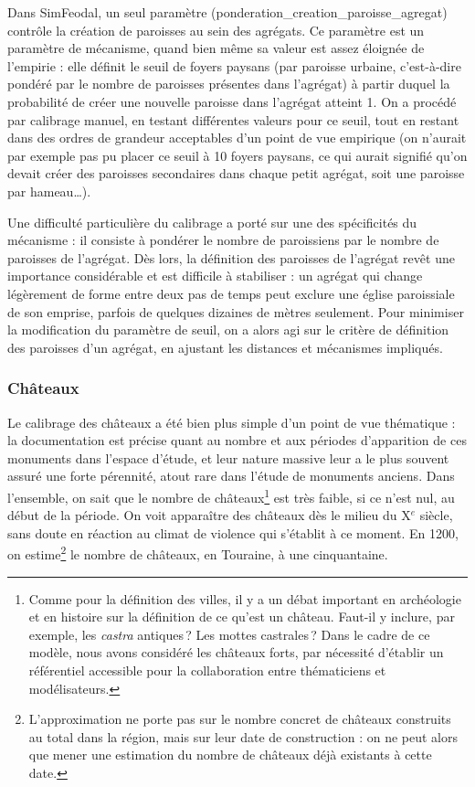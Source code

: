 Dans SimFeodal, un seul paramètre (\textsf{ponderation\_creation\_paroisse\_agregat}) contrôle la création de paroisses au sein des agrégats.
Ce paramètre est un \og paramètre de mécanisme\fg{}, quand bien même sa valeur est assez éloignée de l'empirie : elle définit le seuil de foyers paysans (par paroisse urbaine, c'est-à-dire pondéré par le nombre de paroisses présentes dans l'agrégat) à partir duquel la probabilité de créer une nouvelle paroisse dans l'agrégat atteint 1.
On a procédé par calibrage manuel, en testant différentes valeurs pour ce seuil, tout en restant dans des ordres de grandeur acceptables d'un point de vue empirique (on n'aurait par exemple pas pu placer ce seuil à 10 foyers paysans, ce qui aurait signifié qu'on devait créer des paroisses secondaires dans chaque petit agrégat, soit une paroisse par hameau\ldots).

Une difficulté particulière du calibrage a porté sur une des spécificités du mécanisme : il consiste à pondérer le nombre de paroissiens par le nombre de paroisses de l'agrégat.
Dès lors, la définition des \og paroisses de l'agrégat\fg{} revêt une importance considérable et est difficile à stabiliser : un agrégat qui change légèrement de forme entre deux pas de temps peut \og exclure\fg{} une église paroissiale de son emprise, parfois de quelques dizaines de mètres seulement.
Pour minimiser la modification du paramètre de seuil, on a alors agi sur le critère de définition des paroisses d'un agrégat, en ajustant les distances et mécanismes impliqués.


\subsubsection*{Châteaux}

Le calibrage des châteaux a été bien plus simple d'un point de vue thématique : la documentation est précise quant au nombre et aux périodes d'apparition de ces monuments dans l'espace d'étude, et leur nature massive leur a le plus souvent assuré une forte pérennité, atout rare dans l'étude de monuments anciens.
Dans l'ensemble, on sait que le nombre de châteaux\footnote{
	Comme pour la définition des villes, il y a un débat important en archéologie et en histoire sur la définition de ce qu'est un château. Faut-il y inclure, par exemple, les \textit{castra} antiques ? Les mottes castrales ? Dans le cadre de ce modèle, nous avons considéré les \og châteaux forts\fg{}, par nécessité d'établir un référentiel accessible pour la collaboration entre thématiciens et modélisateurs.
} est très faible, si ce n'est nul, au début de la période.
On voit apparaître des châteaux dès le milieu du X$^e$ siècle, sans doute en réaction au climat de violence qui s'établit à ce moment.
En 1200, on estime\footnote{
	L'approximation ne porte pas sur le nombre concret de châteaux construits au total dans la région, mais sur leur date de construction : on ne peut alors que mener une estimation du nombre de châteaux déjà existants à cette date.
} le nombre de châteaux, en Touraine, à une cinquantaine.

